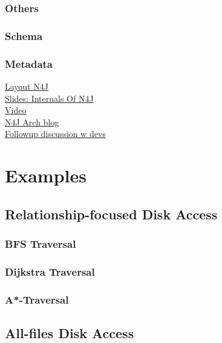 \documentclass[a4paper,10pt]{article}
\begin{document}
    \subsubsection{Others}
        \subsubsection{Schema}
        \subsubsection{Metadata}

    
    
    


\href{https://neo4j.com/developer/kb/understanding-data-on-disk/}{Layout N4J} \\
\href{https://www.slideshare.net/thobe/an-overview-of-neo4j-internals}{Slides: Internals Of N4J} \\
\href{https://skillsmatter.com/skillscasts/2968-neo4j-internals}{Video} \\
\href{http://key-value-stories.blogspot.com/2015/02/neo4j-architecture.html}{N4J Arch blog} \\
\href{https://groups.google.com/g/neo4j/c/cxClivwF94k}{Followup discussion w devs}


\section{Examples}
\subsection{Relationship-focused Disk Access}
    \subsubsection{BFS Traversal}

    \subsubsection{Dijkstra Traversal}

    \subsubsection{A*-Traversal}

\subsection{All-files Disk Access}
\end{document}
